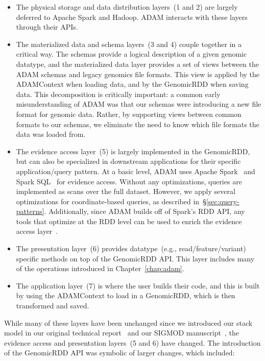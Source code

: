 \documentclass[phd]{ucbthesis}
\begin{document}
\begin{itemize}
\item The physical storage and data distribution layers~(1 and 2) are largely
  deferred to {Apache Spark} and {Hadoop}. {ADAM} interacts
  with these layers through their APIs.
\item The materialized data and schema layers~(3 and 4) couple together in a
  critical way. The schemas provide a logical description of a given genomic
  datatype, and the materialized data layer provides a set of views between the
  {ADAM} schemas and legacy genomics file formats. This view is applied
  by the {ADAMContext} when loading data, and by the {GenomicRDD}
  when saving data. This decomposition is critically important: a common early
  misunderstanding of {ADAM} was that our schemas were introducing a new
  file format for genomic data. Rather, by supporting views between common
  formats to our schemas, we eliminate the need to know which file formats the
  data was loaded from.
\item The evidence access layer~(5) is largely implemented in the
  {GenomicRDD}, but can also be specialized in downstream applications
  for their specific application/query pattern. At a basic level, {ADAM}
  uses {Apache Spark}~\cite{zaharia12} and {Spark
    SQL}~\cite{armbrust15} for evidence access. Without any optimizations,
  queries are implemented as scans over the full dataset. However, we apply
  several optimizations for coordinate-based queries, as described
  in~\S\ref{sec:query-patterns}. Additionally, since {ADAM} builds off of
  {Spark}'s RDD API, any tools that optimize at the RDD level can be used
  to enrich the evidence access layer~\cite{tu16, morrow17}.
\item The presentation layer~(6) provides datatype~(e.g., read/feature/variant)
  specific methods on top of the {GenomicRDD} API. This layer includes
  many of the operations introduced in Chapter~\ref{chap:adam}.
\item The application layer~(7) is where the user builds their code, and this is
  built by using the {ADAMContext} to load in a {GenomicRDD},
  which is then transformed and saved.
\end{itemize}

While many of these layers have been unchanged since we introduced our stack
model in our original technical report~\cite{massie13} and our SIGMOD
manuscript~\cite{nothaft15}, the evidence access and presentation layers~(5 and
6) have changed. The introduction of the
{GenomicRDD} API was symbolic of larger changes, which included:
\end{document}

